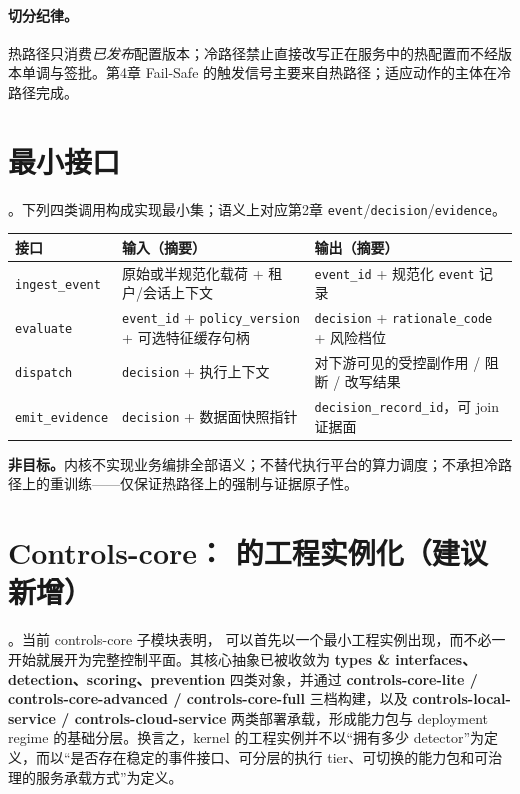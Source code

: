\documentclass[11pt,a4paper]{report}
\begin{document}
\paragraph{切分纪律。}热路径只消费\emph{已发布}配置版本；冷路径禁止直接改写正在服务中的热配置而不经版本单调与签批。第4章 Fail-Safe 的触发信号主要来自热路径；适应动作的主体在冷路径完成。

\section{\SafetyKernel{} 最小接口}
\DecoupledSafety{}。下列四类调用构成实现最小集；语义上对应第2章 \texttt{event}/\texttt{decision}/\texttt{evidence}。

\begin{center}
\footnotesize
\begin{tabular}{@{}p{}p{}p{}@{}}
\toprule
\textbf{接口} & \textbf{输入（摘要）} & \textbf{输出（摘要）} \\
\midrule
\texttt{ingest\_event} & 原始或半规范化载荷 + 租户/会话上下文 & \texttt{event\_id} + 规范化 \texttt{event} 记录 \\
\texttt{evaluate} & \texttt{event\_id} + \texttt{policy\_version} + 可选特征缓存句柄 & \texttt{decision} + \texttt{rationale\_code} + 风险档位 \\
\texttt{dispatch} & \texttt{decision} + 执行上下文 & 对下游可见的受控副作用 / 阻断 / 改写结果 \\
\texttt{emit\_evidence} & \texttt{decision} + 数据面快照指针 & \texttt{decision\_record\_id}，可 join 证据面 \\
\bottomrule
\end{tabular}
\end{center}

\noindent\textbf{非目标。}内核不实现业务编排全部语义；不替代执行平台的算力调度；不承担冷路径上的重训练——仅保证热路径上的强制与证据原子性。

\section{Controls-core：\SafetyKernel{} 的工程实例化（建议新增）}
\DecoupledSafety{}。当前 controls-core 子模块表明，\SafetyKernel{} 可以首先以一个最小工程实例出现，而不必一开始就展开为完整控制平面。其核心抽象已被收敛为 \textbf{types \& interfaces、detection、scoring、prevention} 四类对象，并通过 \textbf{controls-core-lite / controls-core-advanced / controls-core-full} 三档构建，以及 \textbf{controls-local-service / controls-cloud-service} 两类部署承载，形成能力包与 deployment regime 的基础分层。换言之，kernel 的工程实例并不以“拥有多少 detector”为定义，而以“是否存在稳定的事件接口、可分层的执行 tier、可切换的能力包和可治理的服务承载方式”为定义。
\end{document}
